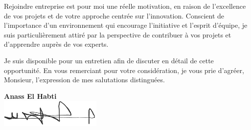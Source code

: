 \documentclass[a4paper,11pt]{letter}
\begin{document}
Rejoindre {entreprise} est pour moi une réelle motivation, en raison de l'excellence de vos projets et de votre approche centrée sur l'innovation. Conscient de l'importance d'un environnement qui encourage l'initiative et l'esprit d'équipe, je suis particulièrement attiré par la perspective de contribuer à vos projets et d’apprendre auprès de vos experts.

Je suis disponible pour un entretien afin de discuter en détail de cette opportunité. En vous remerciant pour votre considération, je vous prie d'agréer, Monsieur, l'expression de mes salutations distinguées.
\vspace*{3cm} %

\begin{minipage}{\textwidth}
    \raggedleft
    \textbf{Anass El Habti} \\ %
    \includegraphics[width=5cm]{signature_pandadoc.png} %
\end{minipage}
\end{document}

